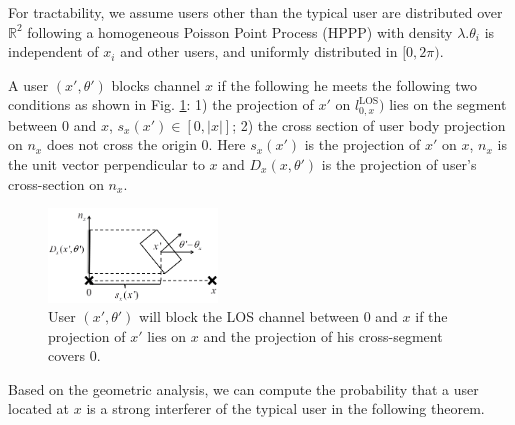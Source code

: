 \documentclass[10pt, conference, letterpaper]{IEEEtran}
\begin{document}
For tractability, we assume users other than the typical user are distributed over $\mathbb{R}^2$ following a homogeneous Poisson Point Process (HPPP) with density $\lambda$.$\theta_i$ is independent of $x_i$ and other users, and uniformly distributed in $[0, 2\pi)$. 

A user $(x', \theta')$ blocks channel $x$ if the following he meets the following two conditions as shown in Fig. \ref{fig:Channel_enb}: 1) the projection of $x'$ on $l_{0,x}^{\mathrm{LOS}}\big)$ lies on the segment between $0$ and $x$, $s_x(x')\in [0,|x|]$; 2) the cross section of user body projection on $n_x$ does not cross the origin $0$. Here $s_x(x')$ is the projection of $x'$ on $x$, $n_x$ is the unit vector perpendicular to $x$ and $D_x(x, \theta')$ is the projection of user's cross-section on $n_x$.
 
\begin{figure}
	\centering
	\includegraphics[width = 0.4\textwidth]{Channel_ENB.pdf}
	\caption{User $(x', \theta')$ will block the LOS channel between $0$ and $x$ if the projection of $x'$ lies on $x$ and the projection of his cross-segment covers $0$. }
	\label{fig:Channel_enb}
\end{figure}

Based on the geometric analysis, we can compute the probability that a user located at $x$ is a strong interferer of the typical user in the following theorem.  
\end{document}
